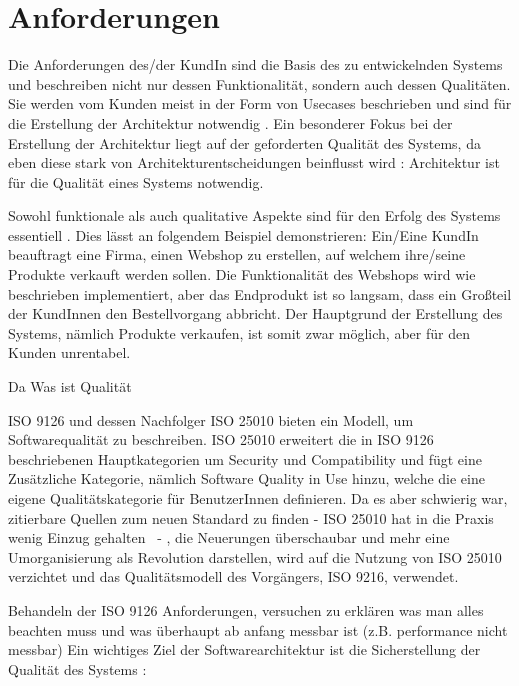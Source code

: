 \chapter{Anforderungen}
Die Anforderungen des/der KundIn sind die Basis des zu entwickelnden Systems und beschreiben nicht nur dessen Funktionalität, sondern auch dessen Qualitäten. Sie werden vom Kunden meist in der Form von Usecases beschrieben \cite[S. 78]{reqanalysis} und sind für die Erstellung der Architektur notwendig \cite[S. 9]{softarch}. Ein besonderer Fokus bei der Erstellung der Architektur liegt auf der geforderten Qualität des Systems, da eben diese stark von Architekturentscheidungen beinflusst wird \cite[S. 109]{softarch}: \glqq Architektur ist für die Qualität eines Systems notwendig\grqq \cite[S. 59]{effektiv}.

Sowohl funktionale als auch qualitative Aspekte sind für den Erfolg des Systems essentiell \cite[S. 109]{softarch}. Dies lässt an folgendem Beispiel demonstrieren: Ein/Eine KundIn beauftragt eine Firma, einen Webshop zu erstellen, auf welchem ihre/seine Produkte verkauft werden sollen. Die Funktionalität des Webshops wird wie beschrieben implementiert, aber das Endprodukt ist so langsam, dass ein Großteil der KundInnen den Bestellvorgang abbricht. Der Hauptgrund der Erstellung des Systems, nämlich Produkte verkaufen, ist somit zwar möglich, aber für den Kunden unrentabel.


Da Was ist Qualität \cite[S. 399]{pract}

ISO 9126 \cite{ISO_SQ} und dessen Nachfolger ISO 25010 \cite{ISO_SQ2} bieten ein Modell, um Softwarequalität zu beschreiben. ISO 25010 erweitert die in ISO 9126 beschriebenen Hauptkategorien um Security und Compatibility und fügt eine Zusätzliche Kategorie, nämlich Software Quality in Use hinzu, welche die eine eigene Qualitätskategorie für BenutzerInnen definieren. Da es aber schwierig war, zitierbare Quellen zum neuen Standard zu finden - ISO 25010 hat \glqq in die Praxis wenig Einzug gehalten\grqq \ \cite[S. 60]{effektiv} - , die Neuerungen überschaubar und mehr eine Umorganisierung als Revolution darstellen, wird auf die Nutzung von ISO 25010 verzichtet und das Qualitätsmodell des Vorgängers, ISO 9216, verwendet.



Behandeln der ISO 9126 Anforderungen, versuchen zu erklären was man alles beachten muss und was überhaupt ab anfang messbar ist (z.B. performance nicht messbar)
Ein wichtiges Ziel der Softwarearchitektur ist die Sicherstellung der Qualität des Systems \cite[S. 19]{effektiv}:


